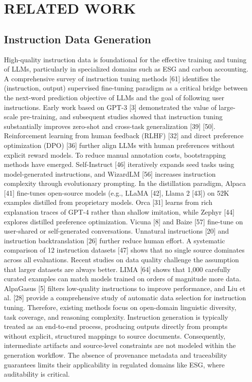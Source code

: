 \documentclass[9pt,twocolumn]{extarticle}
\begin{document}
\section{RELATED WORK}
\subsection{Instruction Data Generation}
High-quality instruction data is foundational for the effective training
and tuning of LLMs, particularly in specialized domains such as ESG and
carbon accounting. A comprehensive survey of instruction tuning methods
[61] identifies the (instruction, output)
supervised fine-tuning paradigm as a critical bridge between the
next-word prediction objective of LLMs and the goal of following user
instructions. Early work based on GPT-3 [3]
demonstrated the value of large-scale pre-training, and subsequent
studies showed that instruction tuning substantially improves zero-shot
and cross-task generalization [39]
[50]. Reinforcement learning from human feedback
(RLHF) [32] and direct preference optimization
(DPO) [36] further align LLMs with human
preferences without explicit reward models.
To reduce manual annotation costs, bootstrapping methods have emerged.
Self-Instruct [46] iteratively expands seed tasks
using model-generated instructions, and WizardLM
[56] increases instruction complexity through
evolutionary prompting. In the distillation paradigm, Alpaca
[41] fine-tunes open-source models (e.g., LLaMA
[42], Llama 2 [43]) on 52K
examples distilled from proprietary models. Orca
[31] learns from rich explanation traces of GPT-4
rather than shallow imitation, while Zephyr [44]
explores distilled preference optimization. Vicuna
[8] and Baize [57]
fine-tune on user-shared or self-generated conversations. Unnatural
instructions [20] and instruction backtranslation
[26] further reduce human effort. A systematic
comparison of 12 instruction datasets [47] shows
that no single source dominates across all evaluations.
Recent studies on data quality challenge the assumption that larger
datasets are always better. LIMA [64] shows that
1,000 carefully curated examples can match models trained on orders of
magnitude more data. AlpaGasus [5] filters
low-quality instructions to improve performance, and Liu et al.
[28] provide a comprehensive study of automatic
data selection for instruction tuning.
Therefore, existing methods focus on open-domain linguistic diversity,
task coverage, and reasoning complexity. Instruction generation is
typically treated as an end-to-end process, producing outputs directly
from prompts without explicit, structured mappings to source documents.
Consequently, intermediate artifacts and source-level constraints are
not modeled within the generation workflow. The absence of provenance
metadata and traceability guarantees limits their applicability in
regulated domains like ESG, where auditability is critical.
\end{document}

